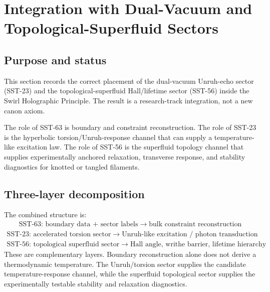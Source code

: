 \documentclass[11pt]{article}
\begin{document}
    \section{Integration with Dual-Vacuum and Topological-Superfluid Sectors}

    \subsection{Purpose and status}

        This section records the correct placement of the dual-vacuum Unruh-echo
        sector (SST-23) and the topological-superfluid Hall/lifetime sector
        (SST-56) inside the Swirl Holographic Principle.  The result is a
        research-track integration, not a new canon axiom.

        The role of SST-63 is boundary and constraint reconstruction.  The role
        of SST-23 is the hyperbolic torsion/Unruh-response channel that can
        supply a temperature-like excitation law.  The role of SST-56 is the
        superfluid topology channel that supplies experimentally anchored
        relaxation, transverse response, and stability diagnostics for knotted
        or tangled filaments.

    \subsection{Three-layer decomposition}

        The combined structure is:
        \begin{align}
            \boxed{
            \text{SST-63: boundary data + sector labels}
            \;\longrightarrow\;
            \text{bulk constraint reconstruction}
            }
            \label{eq:sst63_constraint_layer}
        \end{align}
        \begin{align}
            \boxed{
            \text{SST-23: accelerated torsion sector}
            \;\longrightarrow\;
            \text{Unruh-like excitation / photon transduction}
            }
            \label{eq:sst23_unruh_layer}
        \end{align}
        \begin{align}
            \boxed{
            \text{SST-56: topological superfluid sector}
            \;\longrightarrow\;
            \text{Hall angle, writhe barrier, lifetime hierarchy}
            }
            \label{eq:sst56_superfluid_layer}
        \end{align}
        These are complementary layers.  Boundary reconstruction alone does not
        derive a thermodynamic temperature.  The Unruh/torsion sector supplies
        the candidate temperature-response channel, while the superfluid
        topological sector supplies the experimentally testable stability and
        relaxation diagnostics.
\end{document}
